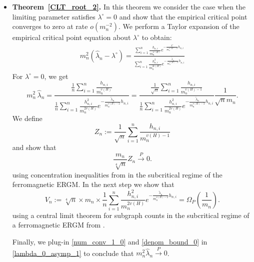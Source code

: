 \documentclass[12pt]{article}
\numberwithin{equation}{section}
\begin{document}
\begin{itemize}
    \item \textbf{Theorem~\ref{CLT_root_2}.} 
In this theorem we consider the case when the limiting parameter satisfies
    $\lambda^{\circ}=0$ and show that the
    empirical critical point converges to zero at rate $o(m_n^{-2})$. We perform a Taylor expansion of the empirical critical point equation about $\lambda^{\circ}$ to obtain:
\begin{align*}
 m_n^2(\hat{\lambda}_n - \lambda^{\circ}) = \frac{\sum\limits_{i=1}^{n}\frac{h_{n,i}}{m_n^{v(H)}}e^{-\frac{\lambda^{\circ}}{m_n^{v(H)-2}}h_{n,i}}}{\sum\limits_{i=1}^{n}\frac{h_{n,i}^2}{m_n^{2v(H)}}e^{-\frac{\tilde{\lambda}_n}{m_n^{v(H)-2}}h_{n,i}} }
\end{align*}
For $\lambda^{\circ}=0$, we get
\begin{equation}
m_n^2 \,\hat{\lambda}_n
=
\frac{\frac{1}{n}\displaystyle \sum_{i=1}^{n} \frac{h_{n,i}}{m_n^{v(H)}}}
     {\frac{1}{n}\displaystyle \sum\limits_{i=1}^{n}\frac{h_{n,i}^2}{m_n^{2v(H)}}e^{-\frac{\tilde{\lambda}_n}{m_n^{v(H)-2}}h_{n,i}} }=\frac{\frac{1}{\sqrt{n}}\displaystyle \sum_{i=1}^{n} \frac{h_{n,i}}{m_n^{v(H)-1}}}{\frac1n\displaystyle \sum\limits_{i=1}^{n}\frac{h_{n,i}^2}{m_n^{2v(H)}}e^{-\frac{\tilde{\lambda}_n}{m_n^{v(H)-2}}h_{n,i}}}\frac{1}{\sqrt{n}{m_n}}.\label{lambda_0_asymp_1}
\end{equation}
We define
\[
    Z_n := \frac{1}{\sqrt{n}} \sum_{i=1}^{n} \frac{h_{n,i}}{m_n^{v(H)-1}}
\]
and show that
\begin{equation}
    \frac{m_n}{\sqrt[4]{n}} Z_n \xrightarrow{P} 0 .
    \label{num_conv_1_0}
\end{equation}
using concentration inequalities from \cite{ganguly2024sub} in the subcritical regime of the ferromagnetic ERGM.
 In the next step we show that 
 \begin{equation}V_n:= \sqrt[4]{n}\times m_n\times\frac{1}{n} \sum_{i=1}^{n} \frac{h_{n,i}^2}{m_n^{2v(H)}}e^{-\frac{\tilde{\lambda}_n}{m_n^{v(H)-2}}h_{n,i}} = \Omega_P\left(\frac{1}{m_n}\right).\label{denom_bound_0}\end{equation}
using a central limit theorem for subgraph counts in the subcritical regime of a ferromagnetic ERGM from \cite{winstein2025quantitative}.

Finally, we plug-in \eqref{num_conv_1_0} and \eqref{denom_bound_0} in \eqref{lambda_0_asymp_1} to conclude
that $m_n^2\hat{\lambda}_n\xrightarrow{P} 0$.\\



\end{itemize}
\end{document}
